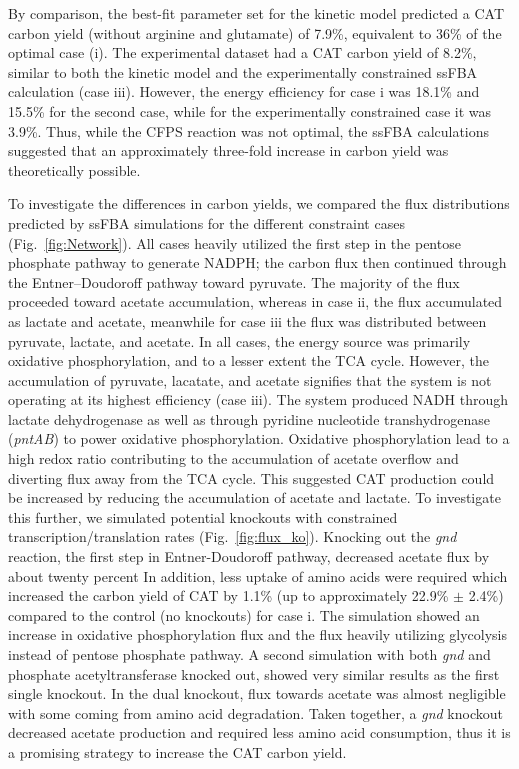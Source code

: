 \documentclass[12pt]{article}
\begin{document}
By comparison, the best-fit parameter set for the kinetic model predicted a CAT carbon yield (without arginine and glutamate) of 7.9\%, equivalent to 36\% of the optimal case (i).
The experimental dataset had a CAT carbon yield of 8.2\%, similar to both the kinetic model and the experimentally constrained ssFBA calculation (case iii).
However, the energy efficiency for case i was 18.1\% and 15.5\% for the second case, while for the experimentally constrained case it was 3.9\%.  
Thus, while the CFPS reaction was not optimal, the ssFBA calculations suggested that an approximately three-fold increase in carbon yield was theoretically possible.

To investigate the differences in carbon yields, we compared the flux distributions predicted by ssFBA simulations for the different constraint cases  (Fig.~\ref{fig:Network}).
All cases heavily utilized the first step in the pentose phosphate pathway to generate NADPH;
the carbon flux then continued through the Entner–Doudoroff pathway toward pyruvate.
The majority of the flux proceeded toward acetate accumulation, whereas in case ii, the flux accumulated as lactate and acetate, meanwhile for case iii the flux was distributed between pyruvate, lactate, and acetate.
In all cases, the energy source was primarily oxidative phosphorylation, and to a lesser extent the TCA cycle.
However, the accumulation of pyruvate, lacatate, and acetate signifies that the system is not operating at its highest efficiency (case iii).
The system produced NADH through lactate dehydrogenase as well as through pyridine nucleotide transhydrogenase (\textit{pntAB}) to power oxidative phosphorylation.
Oxidative phosphorylation lead to a high redox ratio contributing to the accumulation of acetate overflow and diverting flux away from the TCA cycle.
This suggested CAT production could be increased by reducing the accumulation of acetate and lactate.
To investigate this further, we simulated potential knockouts with constrained transcription/translation rates  (Fig.~\ref{fig:flux_ko}).
Knocking out the \textit{gnd} reaction, the first step in Entner-Doudoroff pathway, decreased acetate flux by about twenty percent
In addition, less uptake of amino acids were required which increased the carbon yield of CAT by 1.1\% (up to approximately 22.9\% $\pm$ 2.4\%) compared to the control (no knockouts) for case i.
The simulation showed an increase in oxidative phosphorylation flux and the flux heavily utilizing glycolysis instead of pentose phosphate pathway.
A second simulation with both \textit{gnd} and phosphate acetyltransferase knocked out,
showed very similar results as the first single knockout.
In the dual knockout, flux towards acetate was almost negligible with some coming from amino acid degradation.
Taken together, a \textit{gnd} knockout decreased acetate production and required less amino acid consumption, thus it is a promising strategy to increase the CAT carbon yield.
\end{document}
